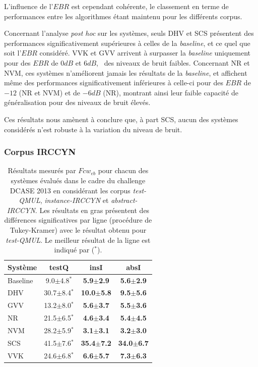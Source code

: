 
L'influence de l'$EBR$ est cependant cohérente, le classement en terme de performances entre les algorithmes étant maintenu pour les différents corpus.

Concernant l'analyse \emph{post hoc} sur les systèmes, seuls DHV et SCS présentent des performances significativement supérieures à celles de la \emph{baseline}, et ce quel que soit l'$EBR$ considéré. VVK et GVV arrivent à surpasser la \emph{baseline} uniquement pour des $EBR$ de $0dB$ et $6dB$, \ie~des niveaux de bruit faibles. Concernant NR et NVM, ces systèmes n'améliorent jamais les résultats de la \emph{baseline}, et affichent même des performances significativement inférieures à celle-ci pour des $EBR$ de $-12$ (NR et NVM) et de $-6dB$ (NR), montrant ainsi leur faible capacité de généralisation pour des niveaux de bruit élevés.

Ces résultats nous amènent à conclure que, à part SCS, aucun des systèmes considérés n'est robuste à la variation du niveau de bruit.

\subsubsection{Corpus IRCCYN}

\begin{table}
\begin{center} 
\begin{tabular}{lccc}
Système  & testQ            & insI                   & absI \\ 
\hline 
Baseline & 9.0$\pm$4.8$^*$  &  \textbf{5.9$\pm$2.9}  &  \textbf{5.6$\pm$2.9} \\ 
DHV      & 30.7$\pm$8.4$^*$ &  \textbf{10.0$\pm$5.8} &  \textbf{9.5$\pm$5.6} \\ 
GVV      & 13.2$\pm$8.0$^*$ &  \textbf{5.6$\pm$3.7}  &  \textbf{5.5$\pm$3.6} \\
NR       & 21.5$\pm$6.5$^*$ &  \textbf{4.6$\pm$3.4}  &  \textbf{5.4$\pm$4.5} \\ 
NVM      & 28.2$\pm$5.9$^*$ &  \textbf{3.1$\pm$3.1}  &  \textbf{3.2$\pm$3.0} \\ 
SCS      & 41.5$\pm$7.6$^*$ &  \textbf{35.4$\pm$7.2} & \textbf{34.0$\pm$6.7} \\ 
VVK      & 24.6$\pm$6.8$^*$ &  \textbf{6.6$\pm$5.7}  &  \textbf{7.3$\pm$6.3} \\ 
\hline
\end{tabular} 
\end{center}  
\caption[Résultats mesurés par $Fcw_{eb}$ pour chacun des systèmes évalués dans le cadre du challenge DCASE 2013 en considérant les corpus \emph{test-QMUL}, \emph{instance-IRCCYN} et \emph{abstract-IRCCYN}.]{Résultats mesurés par $Fcw_{eb}$ pour chacun des systèmes évalués dans le cadre du challenge DCASE 2013 en considérant les corpus \emph{test-QMUL}, \emph{instance-IRCCYN} et \emph{abstract-IRCCYN}. Les résultats en gras présentent des différences significatives par ligne (procédure de Tukey-Kramer) avec le résultat obtenu pour \emph{test-QMUL}. Le meilleur résultat de la ligne est indiqué par ($^*$).}
\label{tab:irccyn} 
\end{table} 

